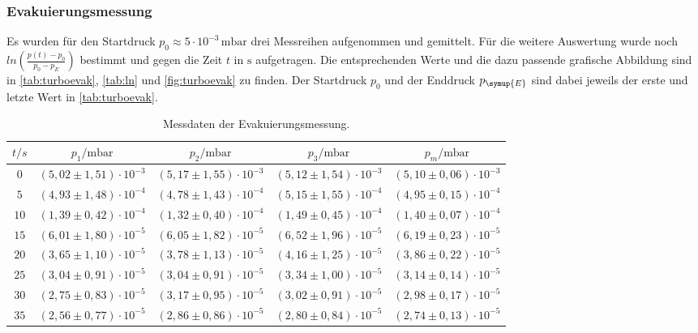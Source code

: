 \subsubsection{Evakuierungsmessung}
Es wurden für den Startdruck $p_{0} \approx 5\cdot 10^{-3}\,\si{\milli\bar}$ drei Messreihen aufgenommen und
gemittelt. Für die weitere Auswertung wurde noch $ln(\frac{p(t)-p_0}{p_0 - p_E})$ bestimmt und gegen die Zeit
$t$ in $\si{\second}$ aufgetragen. Die entsprechenden Werte und die dazu passende
grafische Abbildung sind in \autoref{tab:turboevak}, \autoref{tab:ln} und \autoref{fig:turboevak} zu finden. Der
Startdruck $p_{0}$ und der Enddruck $p_{\symup{E}}$ sind dabei jeweils der erste und letzte Wert in
\autoref{tab:turboevak}.

\begin{table}[H]
  \centering
  \caption{Messdaten der Evakuierungsmessung.}
  \label{tab:turboevak}
  \begin{tabular}{c c c c c }
    \toprule
    $t/s$ & $p_1 /\si{\milli\bar}$ & $p_2 /\si{\milli\bar}$ & $p_3 /\si{\milli\bar}$ & $p_m /\si{\milli\bar}$ \\
    \midrule
    $  0$ & $ (5,02 \pm 1,51)\cdot 10^{-3}$ & $ (5,17 \pm 1,55)\cdot 10^{-3}$ & $ (5,12 \pm 1,54)\cdot 10^{-3}$ & $(5,10 \pm 0,06)\cdot 10^{-3} $ \\
    $  5$ & $ (4,93 \pm 1,48)\cdot 10^{-4}$ & $ (4,78 \pm 1,43)\cdot 10^{-4}$ & $ (5,15 \pm 1,55)\cdot 10^{-4}$ & $(4,95 \pm 0,15)\cdot 10^{-4} $ \\
    $ 10$ & $ (1,39 \pm 0,42)\cdot 10^{-4}$ & $ (1,32 \pm 0,40)\cdot 10^{-4}$ & $ (1,49 \pm 0,45)\cdot 10^{-4}$ & $(1,40 \pm 0,07)\cdot 10^{-4} $ \\
    $ 15$ & $ (6,01 \pm 1,80)\cdot 10^{-5}$ & $ (6,05 \pm 1,82)\cdot 10^{-5}$ & $ (6,52 \pm 1,96)\cdot 10^{-5}$ & $(6,19 \pm 0,23)\cdot 10^{-5} $ \\
    $ 20$ & $ (3,65 \pm 1,10)\cdot 10^{-5}$ & $ (3,78 \pm 1,13)\cdot 10^{-5}$ & $ (4,16 \pm 1,25)\cdot 10^{-5}$ & $(3,86 \pm 0,22)\cdot 10^{-5} $ \\
    $ 25$ & $ (3,04 \pm 0,91)\cdot 10^{-5}$ & $ (3,04 \pm 0,91)\cdot 10^{-5}$ & $ (3,34 \pm 1,00)\cdot 10^{-5}$ & $(3,14 \pm 0,14)\cdot 10^{-5} $ \\
    $ 30$ & $ (2,75 \pm 0,83)\cdot 10^{-5}$ & $ (3,17 \pm 0,95)\cdot 10^{-5}$ & $ (3,02 \pm 0,91)\cdot 10^{-5}$ & $(2,98 \pm 0,17)\cdot 10^{-5} $ \\
    $ 35$ & $ (2,56 \pm 0,77)\cdot 10^{-5}$ & $ (2,86 \pm 0,86)\cdot 10^{-5}$ & $ (2,80 \pm 0,84)\cdot 10^{-5}$ & $(2,74 \pm 0,13)\cdot 10^{-5} $ \\

\end{tabular}
\end{table}
